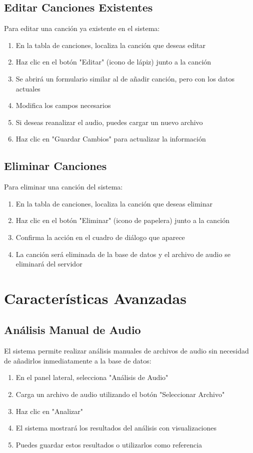 \documentclass[a4paper,12pt]{article}
\begin{document}
\subsection{Editar Canciones Existentes}
Para editar una canción ya existente en el sistema:
\begin{enumerate}
  \item En la tabla de canciones, localiza la canción que deseas editar
  \item Haz clic en el botón "Editar" (icono de lápiz) junto a la canción
  \item Se abrirá un formulario similar al de añadir canción, pero con los datos actuales
  \item Modifica los campos necesarios
  \item Si deseas reanalizar el audio, puedes cargar un nuevo archivo
  \item Haz clic en "Guardar Cambios" para actualizar la información
\end{enumerate}

\subsection{Eliminar Canciones}
Para eliminar una canción del sistema:
\begin{enumerate}
  \item En la tabla de canciones, localiza la canción que deseas eliminar
  \item Haz clic en el botón "Eliminar" (icono de papelera) junto a la canción
  \item Confirma la acción en el cuadro de diálogo que aparece
  \item La canción será eliminada de la base de datos y el archivo de audio se eliminará del servidor
\end{enumerate}

\section{Características Avanzadas}
\subsection{Análisis Manual de Audio}
El sistema permite realizar análisis manuales de archivos de audio sin necesidad de añadirlos inmediatamente a la base de datos:
\begin{enumerate}
  \item En el panel lateral, selecciona "Análisis de Audio"
  \item Carga un archivo de audio utilizando el botón "Seleccionar Archivo"
  \item Haz clic en "Analizar"
  \item El sistema mostrará los resultados del análisis con visualizaciones
  \item Puedes guardar estos resultados o utilizarlos como referencia
\end{enumerate}
\end{document}
